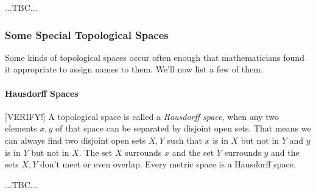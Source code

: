 








...TBC...







\subsubsection{Some Special Topological Spaces}
Some kinds of topological spaces occur often enough that mathematicians found it appropriate to assign names to them. We'll now list a few of them.

\paragraph{Hausdorff Spaces} [VERIFY!] A topological space is called a \emph{Hausdorff space}, when any two elements $x,y$ of that space can be separated by disjoint open sets. That means we can always find two disjoint open sets $X,Y$ such that $x$ is in $X$ but not in $Y$ and $y$ is in $Y$ but not in $X$. The set $X$ surrounds $x$ and the set $Y$ surrounds $y$ and the sets $X,Y$ don't meet or even overlap. Every metric space is a Hausdorff space.

...TBC...



